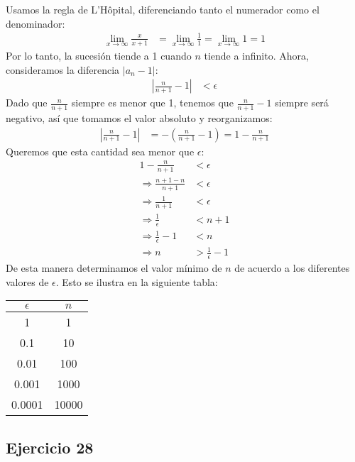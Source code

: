 \documentclass{article}
\begin{document}
    Usamos la regla de L'Hôpital, diferenciando tanto el numerador como el denominador:
    \begin{align*}
    \lim _{x \rightarrow \infty} \frac{x}{x+1} &= \lim _{x \rightarrow \infty} \frac{1}{1} = \lim _{x \rightarrow \infty} 1 = 1
    \end{align*}
    Por lo tanto, la sucesión tiende a 1 cuando $n$ tiende a infinito. Ahora, consideramos la diferencia $|a_n - 1|$:
    \begin{align*}
    \left|\frac{n}{n+1} - 1\right| &< \epsilon
    \end{align*}
    Dado que $\frac{n}{n+1}$ siempre es menor que 1, tenemos que $\frac{n}{n+1} - 1$ siempre será negativo, así que tomamos el valor absoluto y reorganizamos:
    \begin{align*}
    \left|\frac{n}{n+1} - 1\right| &= -\left(\frac{n}{n+1} - 1\right) = 1 - \frac{n}{n+1}
    \end{align*}
    Queremos que esta cantidad sea menor que $\epsilon$:
    \begin{align*}
    1 - \frac{n}{n+1} &< \epsilon \\
    \Rightarrow \frac{n + 1 - n}{n + 1} &< \epsilon \\
    \Rightarrow \frac{1}{n + 1} &< \epsilon \\
    \Rightarrow \frac{1}{\epsilon} &< n + 1 \\
    \Rightarrow \frac{1}{\epsilon} - 1 &< n \\
    \Rightarrow n &> \frac{1}{\epsilon} - 1
    \end{align*}
    De esta manera determinamos el valor mínimo de $n$ de acuerdo a los diferentes valores de $\epsilon$. Esto se ilustra en la siguiente tabla:

    \begin{center}
    \begin{tabular}{c|c}
    $\epsilon$ & $n$ \\
    \hline
    1 & 1 \\
    \hline
    0.1 & 10 \\
    \hline
    0.01 & 100 \\
    \hline
    0.001 & 1000 \\
    \hline
    0.0001 & 10000 \\
    \end{tabular}
    \end{center}



    \subsection*{Ejercicio 28}
\end{document}
